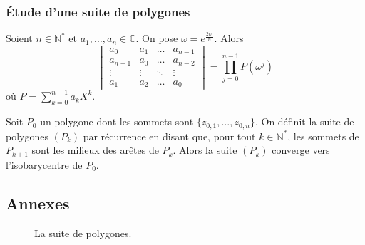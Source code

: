 	\subsubsection{Étude d'une suite de polygones}
	
	
	\begin{lemma}
		Soient $n \in \mathbb{N}^*$ et $a_1, \dots, a_n \in \mathbb{C}$. On pose $\omega = e^{\frac{2i\pi}{n}}$. Alors
		\[ \begin{vmatrix} a_0 & a_1 & \dots & a_{n-1} \\ a_{n-1} & a_0 & \dots & a_{n-2}\\ \vdots & \vdots & \ddots & \vdots \\ a_1 & a_2 & \dots & a_0 \end{vmatrix} = \prod_{j=0}^{n-1} P(\omega^j) \]
		où $P = \sum_{k=0}^{n-1} a_k X^k$.
	\end{lemma}
	
	
	\begin{application}
		Soit $P_0$ un polygone dont les sommets sont $\{ z_{0,1}, \dots, z_{0,n} \}$. On définit la suite de polygones $(P_k)$ par récurrence en disant que, pour tout $k \in \mathbb{N}^*$, les sommets de $P_{k+1}$ sont les milieux des arêtes de $P_k$.
		\newpar
		Alors la suite $(P_k)$ converge vers l'isobarycentre de $P_0$.
	\end{application}
	
	\newpage
	\subsection*{Annexes}
	
	
	\begin{figure}[h]
		\begin{center}
		\end{center}
		\caption{La suite de polygones.}
	\end{figure}

